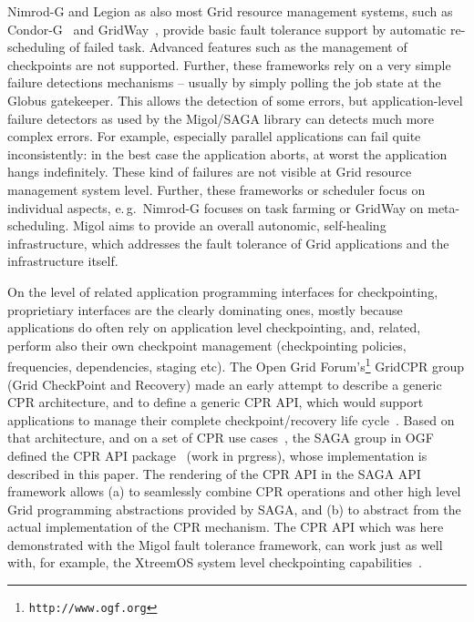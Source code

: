\documentclass[times, 10pt,twocolumn]{article}
\begin{document}
Nimrod-G and Legion as also most Grid resource management systems, such as Condor-G~\cite{citeulike:291860} and GridWay~\cite{Montero05}, provide basic fault tolerance support by automatic re-scheduling of failed task. Advanced features such as the management of checkpoints are not supported. Further, these frameworks rely on a very simple failure detections mechanisms -- usually by simply polling the job state at the Globus gatekeeper. This allows the detection of some errors, but application-level failure detectors as used by the Migol/SAGA library can detects much more complex errors. For example, especially parallel applications can fail quite inconsistently: in the best case the application aborts, at worst the application hangs indefinitely. These kind of failures are not visible at Grid resource management system level. Further, these frameworks or scheduler focus on individual aspects, e.\,g.\ Nimrod-G focuses on task farming or GridWay on meta-scheduling. Migol aims to provide an overall autonomic, self-healing infrastructure, which addresses the fault tolerance of Grid applications and the infrastructure itself. 


On the level of related application programming interfaces for
checkpointing, proprietiary interfaces are the clearly dominating
ones, mostly because applications do often rely on application level
checkpointing, and, related, perform also their own checkpoint
management (checkpointing policies, frequencies, dependencies, staging
etc).  The Open Grid Forum's\footnote{\texttt{http://www.ogf.org}}
GridCPR group (Grid CheckPoint and Recovery) made an early attempt to
describe a generic CPR architecture, and to define a generic CPR API,
which would support applications to manage their complete
checkpoint/recovery life cycle~\cite{ogf_cpr_arch}.  Based on that
architecture, and on a set of CPR use cases~\cite{ogf_cpr_uc}, the
SAGA group in OGF defined the CPR API package~\cite{ogf_cpr_draft}
(work in prgress), whose implementation is described in this paper.
The rendering of the CPR API in the SAGA API framework allows (a) to
seamlessly combine CPR operations and other high level Grid
programming abstractions provided by SAGA, and (b) to abstract from
the actual implementation of the CPR mechanism.  The CPR API which was
here demonstrated with the Migol fault tolerance framework, can work
just as well with, for example, the XtreemOS system level
checkpointing capabilities~\cite{xtreemos_cpr}.

% 
\end{document}
